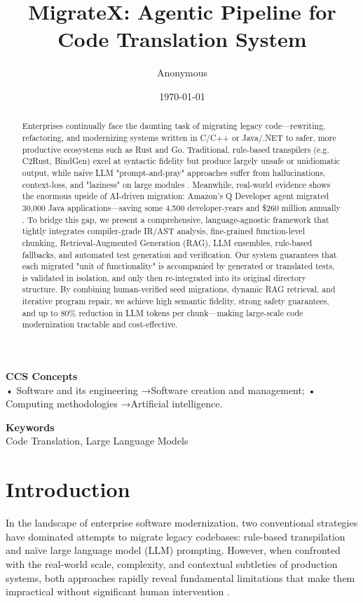 \documentclass[twocolumn]{article}
\title{\textbf{MigrateX: Agentic Pipeline for Code Translation System}}
\author{Anonymous}
\date{\today}
\begin{document}
\fontsize{9}{11}\selectfont
\maketitle
        \begin{abstract}
        Enterprises continually face the daunting task of migrating legacy code—rewriting, refactoring, and modernizing systems written in C/C++ or Java/.NET to safer, more productive ecosystems such as Rust and Go. Traditional, rule-based transpilers (e.g. C2Rust, BindGen) excel at syntactic fidelity but produce largely unsafe or unidiomatic output, while naïve LLM "prompt-and-pray" approaches suffer from hallucinations, context-loss, and "laziness" on large modules \cite{tang2023large}. Meanwhile, real-world evidence shows the enormous upside of AI-driven migration: Amazon's Q Developer agent migrated 30,000 Java applications—saving some 4,500 developer-years and \$260 million annually \cite{aws-genai-director}. To bridge this gap, we present a comprehensive, language-agnostic framework that tightly integrates compiler-grade IR/AST analysis, fine-grained function-level chunking, Retrieval-Augmented Generation (RAG), LLM ensembles, rule-based fallbacks, and automated test generation and verification. Our system guarantees that each migrated "unit of functionality" is accompanied by generated or translated tests, is validated in isolation, and only then re-integrated into its original directory structure. By combining human-verified seed migrations, dynamic RAG retrieval, and iterative program repair, we achieve high semantic fidelity, strong safety guarantees, and up to 80\% reduction in LLM tokens per chunk—making large-scale code modernization tractable and cost-effective.
        \end{abstract}

\vspace{1em}
        \noindent\textbf{CCS Concepts}\\
        • Software and its engineering →Software creation and management; • Computing methodologies →Artificial intelligence.
        
        \vspace{1em}
        \noindent\textbf{Keywords}\\
        Code Translation, Large Language Models

\begingroup
\section{Introduction}
In the landscape of enterprise software modernization, two conventional strategies have dominated attempts to migrate legacy codebases: rule-based transpilation and naïve large language model (LLM) prompting. However, when confronted with the real-world scale, complexity, and contextual subtleties of production systems, both approaches rapidly reveal fundamental limitations that make them impractical without significant human intervention \cite{llama3} \cite{claude} \cite{gemini}.
\end{document}
